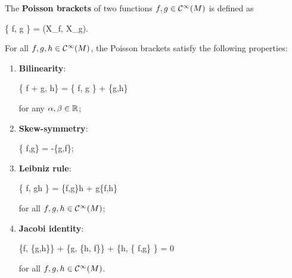 \documentclass[main.tex]{subfiles}
\begin{document}
\begin{definition}
	The \textbf{Poisson brackets} of two functions $f,g \in \mathcal{C}^\infty(M)$ is defined as
	\begin{eqalign}
		\{ f, g \} = \omega(X_f, X_g).
	\end{eqalign}
\end{definition}
\begin{theorem}
	For all $f,g,h \in \mathcal{C}^\infty(M)$, the Poisson brackets satisfy the following properties:
	\begin{enumerate}
		\item \textbf{Bilinearity}:
		\begin{eqalign}
			\{ \alpha f + \beta g, h\} = \alpha \{ f, g \} + \beta \{g,h\}
		\end{eqalign}
		for any $\alpha, \beta \in \mathbb{R}$;
		\item \textbf{Skew-symmetry}:
		\begin{eqalign}
			\{ f,g\} = -\{g,f\};
		\end{eqalign}
		\item \textbf{Leibniz rule}:
		\begin{eqalign}
			\{ f, gh \} = \{f,g\}h + g\{f,h\}
		\end{eqalign}
		for all $f,g,h \in \mathcal{C}^\infty(M)$;
		\item \textbf{Jacobi identity}:
		\begin{eqalign}
			\{f, \{g,h\}\} + \{g, \{h, f\}\} + \{h, \{ f,g\} \} = 0
		\end{eqalign}
		for all $f,g,h \in \mathcal{C}^\infty(M)$.
	\end{enumerate}
\end{theorem}
\end{document}
